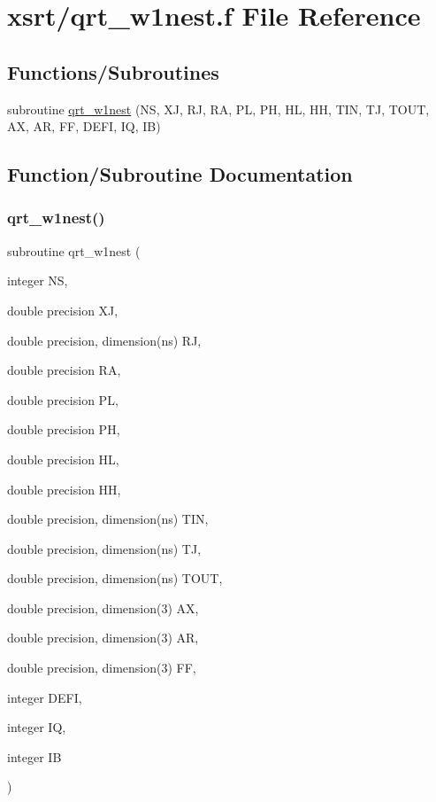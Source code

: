 \hypertarget{qrt__w1nest_8f}{}\section{xsrt/qrt\+\_\+w1nest.f File Reference}
\label{qrt__w1nest_8f}
\subsection*{Functions/\+Subroutines}
\begin{DoxyCompactItemize}
\item 
subroutine \hyperlink{qrt__w1nest_8f_a4629156d1241eef85869d4d3b1f0d3e8}{qrt\+\_\+w1nest} (NS, XJ, RJ, RA, PL, PH, HL, HH, T\+IN, TJ, T\+O\+UT, AX, AR, FF, D\+E\+FI, IQ, IB)
\end{DoxyCompactItemize}


\subsection{Function/\+Subroutine Documentation}
\mbox{\label{qrt__w1nest_8f_a4629156d1241eef85869d4d3b1f0d3e8}} 
\subsubsection{\texorpdfstring{qrt\+\_\+w1nest()}{qrt\_w1nest()}}
{\footnotesize\ttfamily subroutine qrt\+\_\+w1nest (\begin{DoxyParamCaption}\item[{integer}]{NS,  }\item[{double precision}]{XJ,  }\item[{double precision, dimension(ns)}]{RJ,  }\item[{double precision}]{RA,  }\item[{double precision}]{PL,  }\item[{double precision}]{PH,  }\item[{double precision}]{HL,  }\item[{double precision}]{HH,  }\item[{double precision, dimension(ns)}]{T\+IN,  }\item[{double precision, dimension(ns)}]{TJ,  }\item[{double precision, dimension(ns)}]{T\+O\+UT,  }\item[{double precision, dimension(3)}]{AX,  }\item[{double precision, dimension(3)}]{AR,  }\item[{double precision, dimension(3)}]{FF,  }\item[{integer}]{D\+E\+FI,  }\item[{integer}]{IQ,  }\item[{integer}]{IB }\end{DoxyParamCaption})}

